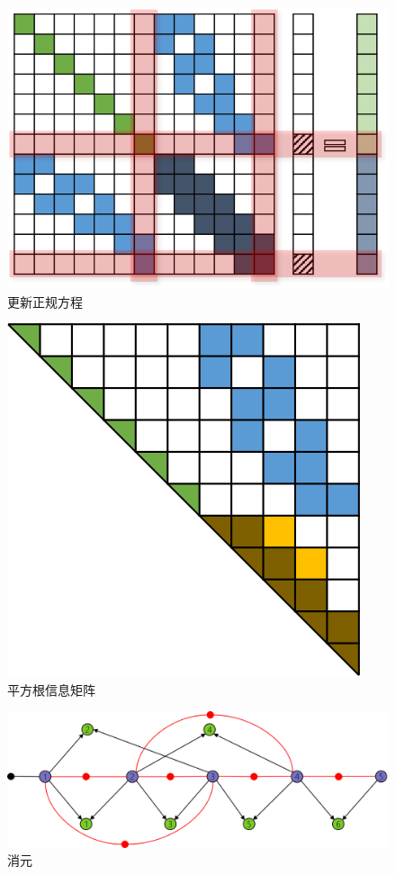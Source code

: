 \begin{figure}[htb!]
    \centering
    \includegraphics{figs/normal_eq_update.png}
    \caption{更新正规方程}
\end{figure}

\begin{figure}[htb!]
    \centering
    \includegraphics{figs/sqrt_info.png}
    \caption{平方根信息矩阵}
\end{figure}

\begin{figure}[htb!]
    \centering
    \includegraphics[width=.8\textwidth]{figs/elim.png}
    \caption{消元}
\end{figure}


